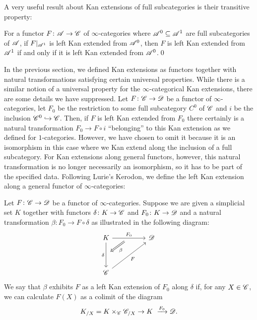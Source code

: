 \documentclass[../../thesis.tex]{subfiles}
\begin{document}
A very useful result about Kan extensions of full subcategories is their transitive property:
\begin{proposition}\label{4.3.2.8}
    For a functor $F\colon \mathscr{A}\to\mathscr{C}$ of $\infty$-categories where $\mathscr{A}^0 \subseteq \mathscr{A}^1$ are full subcategories of $\mathscr{A}$, if $F|_{\mathscr{A}^1}$ is left Kan extended from $\mathscr{A}^0$, then $F$ is left Kan extended from $\mathscr{A}^1$ if and only if it is left Kan extended from $\mathscr{A}^0$.\qed
\end{proposition}
In the previous section, we defined Kan extensions as functors together with natural transformations satisfying certain universal properties.
While there is a similar notion of a universal property for the $\infty$-categorical Kan extensions, there are some details we have suppressed.
Let $F \colon \mathscr{C} \to \mathscr{D}$ be a functor of $\infty$-categories, let $F_0$ be the restriction to some full subcategory $C^{0}$ of $\mathscr{C}$ and $i$ be the inclusion $\mathscr{C}^{0} \hookrightarrow \mathscr{C}$.
Then, if $F$ is left Kan extended from $F_0$ there certainly is a natural transformation $F_0 \to F \circ i$ ``belonging'' to this Kan extension as we defined for $1$-categories. However, we have chosen to omit it because it is an isomorphism in this case where we Kan extend along the inclusion of a full subcategory.
For Kan extensions along general functors, however, this natural transformation is no longer necessarily an isomorphism, so it has to be part of the specified data.
Following Lurie's Kerodon, we define the left Kan extension along a general functor of $\infty$-categories:
\begin{definition}
    Let $F \colon \mathscr{C} \to \mathscr{D}$ be a functor of $\infty$-categories.
    Suppose we are given a simplicial set $K$ together with functors $\delta \colon K \to \mathscr{C}$ and $F_0\colon K \to \mathscr{D}$ and a natural transformation $\beta \colon F_0 \to F \circ \delta$ as illustrated in the following diagram:
    \[\begin{tikzcd}
            K && \D \\
            \\
            \C
            \arrow[""{name=0, anchor=center, inner sep=0}, "\delta"', from=1-1, to=3-1]
            \arrow["F"', from=3-1, to=1-3]
            \arrow[""{name=1, anchor=center, inner sep=0}, "{F_0}", from=1-1, to=1-3]
            \arrow["\beta", shorten <=7pt, shorten >=7pt, Rightarrow, from=1, to=0]
        \end{tikzcd}\]
    We say that $\beta$ exhibits $F$ as a left Kan extension of $F_0$ along $\delta$ if, for any $X \in \mathscr{C}$, we can calculate $F(X)$ as a colimit of the diagram
    \[
        K_{/X} = K\times_{\C}\C_{/X} \to K \xrightarrow{F_0} \D  .
    \]
\end{definition}
\end{document}
